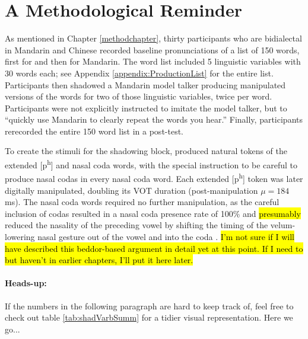     
\section{A Methodological Reminder}
    As mentioned in Chapter \ref{methodchapter}, thirty participants who are bidialectal in Mandarin and \ND{} Chinese recorded baseline pronunciations of a list of 150 words, first for \ND{} and then for Mandarin. The word list included 5 linguistic variables with 30 words each; see Appendix \ref{appendix:ProductionList} for the entire list. Participants then shadowed a Mandarin model talker producing manipulated versions of the words for two of those linguistic variables, twice per word. Participants were not explicitly instructed to imitate the model talker, but to ``quickly use Mandarin to clearly repeat the words you hear.'' Finally, participants rerecorded the entire 150 word list in a \ND{} post-test.
    
    To create the stimuli for the shadowing block, \annie{} produced natural tokens of the extended [p\textsuperscript{h}] and nasal coda words, with the special instruction to be careful to produce nasal codas in every nasal coda word. Each extended [p\textsuperscript{h}] token was later digitally manipulated, doubling its VOT duration (post-manipulation $\mu = 184$ ms). The nasal coda words required no further manipulation, as the careful inclusion of codas resulted in a nasal coda presence rate of 100\% and \hl{presumably} reduced the nasality of the preceding vowel by shifting the timing of the velum-lowering nasal gesture out of the vowel and into the coda \citep{beddor2009coarticulatory}. \hl{I'm not sure if I will have described this beddor-based argument in detail yet at this point. If I need to but haven't in earlier chapters, I'll put it here later.}
    
    \paragraph{Heads-up:} If the numbers in the following paragraph are hard to keep track of, feel free to check out table \ref{tab:shadVarbSumm} for a tidier visual representation. Here we go...
     

